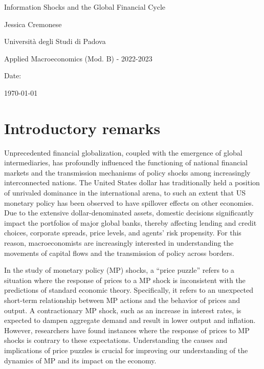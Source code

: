\documentclass[11pt,a4paper]{article}
\begin{document}
\begin{titlepage}
    \centering
    \vspace*{2cm}
    {\LARGE Information Shocks and the Global Financial Cycle \par}
    \vspace{2cm}
    {\large Jessica Cremonese \par}
    \vspace{1cm}
    {\large Università degli Studi di Padova \par}
    \vspace{1cm}
    {\large Applied Macroeconomics (Mod. B) - 2022-2023 \par}
    \vspace{1cm}
    {\large Date: \par}
    {\large \today \par}
\end{titlepage}


\newpage
\section{Introductory remarks}    
Unprecedented financial globalization, coupled with the emergence of global intermediaries, has profoundly influenced the functioning of national financial markets and the transmission mechanisms of policy shocks among increasingly interconnected nations.
The United States dollar has traditionally held a position of unrivaled dominance in the international arena, to such an extent that US monetary policy has been observed to have spillover effects on other economies.
Due to the extensive dollar-denominated assets, domestic decisions significantly impact the portfolios of major global banks, thereby affecting lending and credit choices, corporate spreads, price levels, and agents' risk propensity.
For this reason, macroeconomists are increasingly interested in understanding the movements of capital flows and the transmission of policy across borders. 

In the study of monetary policy (MP) shocks, a \enquote{price puzzle} refers to a situation where the response of prices to a MP shock is inconsistent with the predictions of standard economic theory. Specifically, it refers to an unexpected short-term relationship between MP actions and the behavior of prices and output. 
A contractionary MP shock, such as an increase in interest rates, is expected to dampen aggregate demand and result in lower output and inflation. However, researchers have found instances where the response of prices to MP shocks is contrary to these expectations. 
Understanding the causes and implications of price puzzles is crucial for improving our understanding of the dynamics of MP and its impact on the economy.
\end{document}
